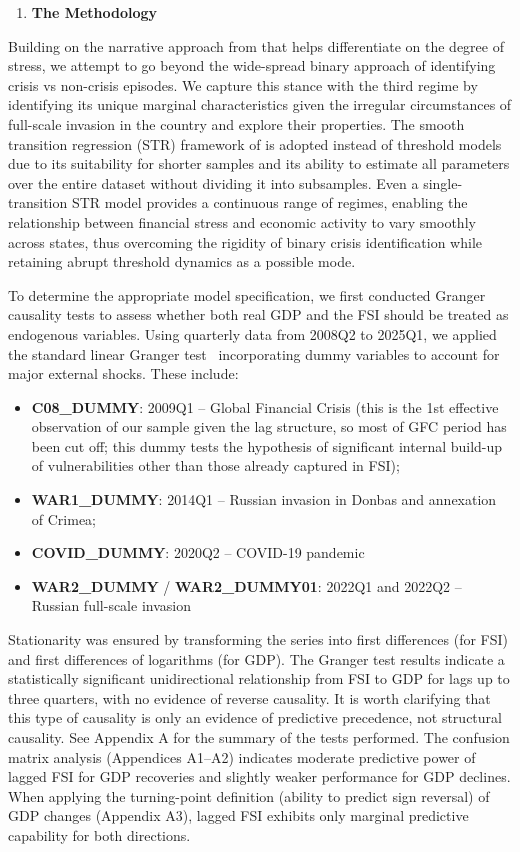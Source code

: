 \documentclass[12pt,preprint,aps,author-year]{revtex4-1}
\begin{document}
\begin{enumerate}
\item \textbf{The Methodology}
\end{enumerate}
Building on the narrative approach from \cite{romer2017} that helps differentiate on the degree of stress, we attempt to go beyond the wide-spread binary approach of identifying crisis vs non-crisis episodes. We capture this stance with the third regime by identifying its unique marginal characteristics given the irregular circumstances of full-scale invasion in the country and explore their properties. The smooth transition regression (STR) framework of \cite{terasvirta1994} is adopted instead of threshold models due to its suitability for shorter samples and its ability to estimate all parameters over the entire dataset without dividing it into subsamples. Even a single-transition STR model provides a continuous range of regimes, enabling the relationship between financial stress and economic activity to vary smoothly across states, thus overcoming the rigidity of binary crisis identification while retaining abrupt threshold dynamics as a possible mode.

To determine the appropriate model specification, we first conducted Granger causality tests to assess whether both real GDP and the FSI should be treated as endogenous variables. Using quarterly data from 2008Q2 to 2025Q1, we applied the standard linear Granger test  \citep{granger1969} incorporating dummy variables to account for major external shocks. These include:

\begin{itemize}
\item \textbf{C08\_DUMMY}: 2009Q1 – Global Financial Crisis (this is the 1st effective observation of our sample given the lag structure, so most of GFC period has been cut off; this dummy tests the hypothesis of significant internal build-up of vulnerabilities other than those already captured in FSI);
\item \textbf{WAR1\_DUMMY}: 2014Q1 – Russian invasion in Donbas and annexation of Crimea;
\item \textbf{COVID\_DUMMY}: 2020Q2 – COVID-19 pandemic
\item \textbf{WAR2\_DUMMY} / \textbf{WAR2\_DUMMY01}: 2022Q1 and 2022Q2 – Russian full-scale invasion
\end{itemize}
Stationarity was ensured by transforming the series into first differences (for FSI) and first differences of logarithms (for GDP). The Granger test results indicate a statistically significant unidirectional relationship from FSI to GDP for lags up to three quarters, with no evidence of reverse causality. It is worth clarifying that this type of causality is only an evidence of predictive precedence, not structural causality. See Appendix A for the summary of the tests performed. The confusion matrix analysis (Appendices A1–A2) indicates moderate predictive power of lagged FSI for GDP recoveries and slightly weaker performance for GDP declines. When applying the turning-point definition (ability to predict sign reversal) of GDP changes (Appendix A3), lagged FSI exhibits only marginal predictive capability for both directions.
\end{document}
